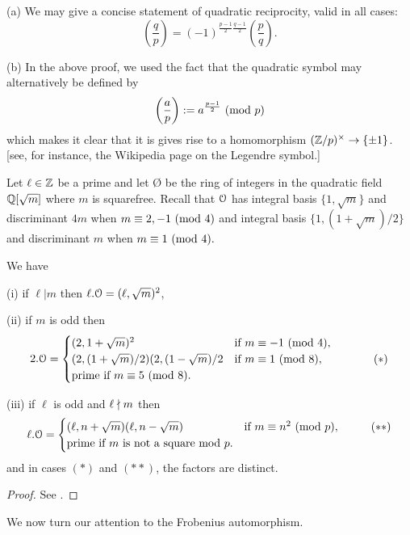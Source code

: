 \documentclass[10pt,a4paper]{amsart}
\begin{document}
\begin{rems}
(a) We may give a concise statement of quadratic reciprocity, valid in all
cases: \[\left( \frac{q}{p} \right) = (-1)^{\frac{p-1}{2}\frac{q-1}{2}} \left(
\frac{p}{q} \right).\]

(b) In the above proof, we used the fact that the quadratic symbol may
alternatively be defined by \[\left( \frac{a}{p} \right) := a^{\frac{p-1}{2}}
\text{ } (\mathrm{mod}\text{ } p)\] which makes it clear that it is gives rise to a homomorphism
$(\mathbb{Z}/p)^\times \rightarrow \{\pm 1\}$. [see, for instance, the Wikipedia page
on the Legendre symbol.]
\end{rems}

\begin{prop}
Let $\ell\in \mathbb{Z}$ be a prime and let \O{} be the ring of integers in the
quadratic field $\mathbb{Q}[\sqrt{m}]$ where $m$ is squarefree. Recall that $\mathcal{O}$ has
integral basis $\{1,\sqrt{m}\}$ and discriminant $4m$ when $m\equiv
2,-1\text{ } (\mathrm{mod}\text{ } 4)$ and integral basis $\{1,(1+\sqrt{m})/2\}$ and discriminant $m$
when $m\equiv 1\text{ } (\mathrm{mod}\text{ } 4).$

We have

(i) if $\ell|m$ then $\ell.\mathcal{O} = (\ell,\sqrt{m})^2$,

(ii) if $m$ is odd then \[2.\mathcal{O} =
\begin{cases}
    (2,1+\sqrt{m})^2 & \text{if } m\equiv -1 \text{ } (\mathrm{mod}\text{ } 4),\\
    (2,(1+\sqrt{m})/2)(2,(1-\sqrt{m})/2 & \text{if } m\equiv 1 \text{ } (\mathrm{mod}\text{ } 8),
    \;\;\;\;\;\;\;\; \;\;\;\;\;\;\;\; (*) \\
    \text{prime if } m\equiv 5 \text{ } (\mathrm{mod}\text{ } 8).
\end{cases} \]

(iii) if $\ell$ is odd and $\ell\nmid m$ then \[\ell.\mathcal{O} =
\begin{cases}
    (\ell,n+\sqrt{m})(\ell,n-\sqrt{m}) & \text{if } m \equiv n^2
    \text{ } (\mathrm{mod}\text{ } p), \;\;\;\;\;\;\;\; \;\; (**)\\
    \text{prime if } m \text{ is not a square mod } p.
\end{cases} \] and in cases $(*)$ and $(**)$, the factors are
distinct.
\end{prop}
\begin{proof} See \cite[25, p.~74]{M}.
\end{proof}

\bigskip

We now turn our attention to the Frobenius automorphism.

\bigskip
\end{document}
